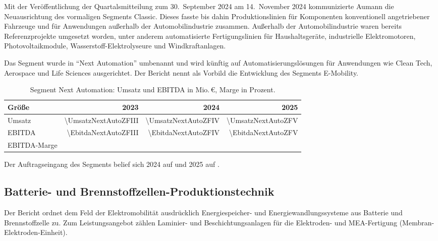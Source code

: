 Mit der Ver\"offentlichung der Quartalsmitteilung zum 30.~September 2024 am
14.~November 2024 kommunizierte Aumann die Neuausrichtung des vormaligen
Segments Classic. Dieses fasste bis dahin Produktionslinien
f\"ur Komponenten konventionell angetriebener Fahrzeuge und f\"ur
Anwendungen au{\ss}erhalb der Automobilindustrie zusammen. Au{\ss}erhalb der
Automobilindustrie waren bereits Referenzprojekte umgesetzt worden, unter
anderem automatisierte Fertigungslinien f\"ur Haushaltsger\"ate, industrielle
Elektromotoren, Photovoltaikmodule, Wasserstoff-Elektrolyseure und
Windkraftanlagen.

Das Segment wurde in \enquote{Next Automation} umbenannt und wird k\"unftig
auf Automatisierungsl\"osungen f\"ur Anwendungen wie Clean Tech, Aerospace und
Life Sciences ausgerichtet. Der Bericht nennt als Vorbild
die Entwicklung des Segments E-Mobility.

\begin{table}[htbp]
\centering
\caption{Segment Next Automation: Umsatz und EBITDA in Mio.\,\euro,
Marge in Prozent.}
\label{tab:next-automation}
\begin{tabular}{@{}lrrr@{}}
\toprule
\textbf{Gr\"o{\ss}e} & \textbf{2023} & \textbf{2024} & \textbf{2025}\\
\midrule
Umsatz       & \num{\UmsatzNextAutoZFIII} & \num{\UmsatzNextAutoZFIV} & \num{\UmsatzNextAutoZFV}\\
EBITDA       & \num{\EbitdaNextAutoZFIII} & \num{\EbitdaNextAutoZFIV} & \num{\EbitdaNextAutoZFV}\\
EBITDA-Marge & \Pct{\EbitdaMargeNextAutoZFIII} & \Pct{\EbitdaMargeNextAutoZFIV}
             & \Pct{\EbitdaMargeNextAutoZFV}\\
\bottomrule
\end{tabular}
\end{table}

\noindent Der Auftragseingang des Segments belief sich 2024 auf
\MioEUR{\AuftragseingangNextAutoZFIV} und 2025 auf
\MioEUR{\AuftragseingangNextAutoZFV}.

\subsection{Batterie- und Brennstoffzellen-Produktionstechnik}
\label{subsec:batterie}

Der Bericht ordnet dem Feld der Elektromobilit\"at ausdr\"ucklich Energie\-speicher-
und Energiewandlungssysteme aus Batterie und Brennstoffzelle
zu. Zum Leistungsangebot z\"ahlen Laminier- und
Beschichtungsanlagen f\"ur die Elektroden- und MEA-Fertigung
(Membran-Elektroden-Einheit).

